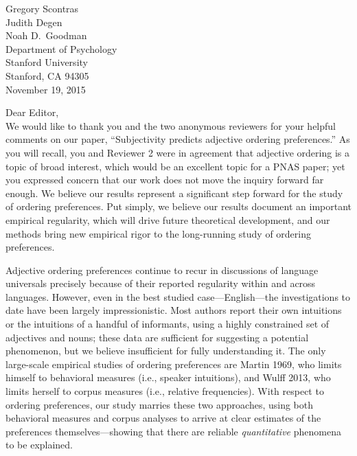 \documentclass[12pt]{article}
\begin{document}
{\flushright

\vspace{25pt}
Gregory Scontras\\
Judith Degen\\
Noah D.~Goodman\\
Department of Psychology\\
Stanford University\\
Stanford, CA 94305\\[20pt]

\noindent November 19, 2015\\[20pt]}


\noindent Dear Editor,\\

\noindent We would like to thank you and the two anonymous reviewers for your helpful comments on our paper, ``Subjectivity predicts adjective ordering preferences.'' As you will recall, you and Reviewer 2 were in agreement that adjective ordering is a topic of broad interest, which would be an excellent topic for a PNAS paper; yet you expressed concern that our work does not move the inquiry forward far enough. We believe our results represent a significant step forward for the study of ordering preferences. Put simply, we believe our results document an important empirical regularity, which will drive future theoretical development, and our methods bring new empirical rigor to the long-running study of ordering preferences. 

Adjective ordering preferences continue to recur in discussions of language universals precisely because of their reported regularity within and across languages. However, even in the best studied case---English---the investigations to date have been largely impressionistic. Most authors report their own intuitions or the intuitions of a handful of informants, using a highly constrained set of adjectives and nouns; these data are sufficient for suggesting a potential phenomenon, but we believe insufficient for fully understanding it. The only large-scale empirical studies of ordering preferences are Martin 1969, who limits himself to behavioral measures (i.e., speaker intuitions), and Wulff 2013, who limits herself to corpus measures (i.e., relative frequencies). With respect to ordering preferences, our study marries these two approaches, using both behavioral measures and corpus analyses to arrive at clear estimates of the preferences themselves---showing that there are reliable \emph{quantitative} phenomena to be explained.
\end{document}
